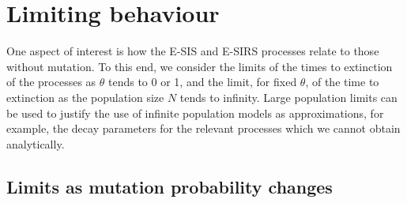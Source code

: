 \documentclass[smallextended]{svjour3}       %
\begin{document}
\section{Limiting behaviour}\label{sec: limit}
One aspect of interest is how the E-SIS and E-SIRS processes relate to those without mutation. To this end, we consider the limits of the times to extinction of the processes as $\theta$ tends to 0 or 1, and the limit, for fixed $\theta$, of the time to extinction as the population size $N$ tends to infinity. Large population limits can be used to justify the use of infinite population models as approximations, for example, the decay parameters for the relevant processes which we cannot obtain analytically. 

\subsection{Limits as mutation probability changes}\label{subsec: theta limit}
\end{document}
